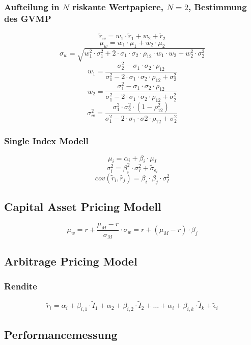 \subsubsection{Aufteilung in \(N\) riskante Wertpapiere, \(N = 2\), Bestimmung des GVMP}
\[\tilde{r}_w = w_1 \cdot \tilde{r}_1 + w_2 + \tilde{r}_2\]
\[\mu_w = w_1 \cdot \mu_1 + w_2 \cdot \mu_2\]
\[\sigma_w = \sqrt{w_1^2 \cdot \sigma_1^2 + 2 \cdot \sigma_1 \cdot \sigma_2 \cdot \rho_{12} \cdot w_1 \cdot w_2 + w_2^2 \cdot \sigma_2^2}\]
\[w_1 = \frac{\sigma_2^2-\sigma_1 \cdot \sigma_2 \cdot \rho_{12}}{\sigma_1^2-2 \cdot \sigma_1 \cdot \sigma_2 \cdot \rho_{12} + \sigma_2^2}\]
\[w_2 = \frac{\sigma_1^2 - \sigma_1 \cdot \sigma_2 \cdot \rho_{12}}{\sigma_1^2 - 2 \cdot \sigma_1 \cdot \sigma_2 \cdot \rho_{12} + \sigma_2^2}\]
\[\sigma_w^2 = \frac{\sigma_1^2 \cdot \sigma_2^2 \cdot (1 - \rho_{12}^2)}{\sigma_1^2 - 2 \cdot \sigma_1 \cdot \sigma2 \cdot \rho_{12} + \sigma_2^2}\]

\subsubsection{Single Index Modell}
\[\mu_i = \alpha_i + \beta_i \cdot \mu_I\]
\[\sigma_i^2 = \beta_i^2 \cdot \sigma_I^2 + \tilde{\sigma}_{\epsilon_i}\]
\[cov(\tilde{r}_i, \tilde{r_j}) = \beta_i \cdot \beta_j \cdot \sigma_I^2\]


\subsection{Capital Asset Pricing Modell}
\[\mu_w = r + \frac{\mu_M - r}{\sigma_M} \cdot \sigma_w = r + (\mu_M - r) \cdot \beta_j\]


\subsection{Arbitrage Pricing Model}

\subsubsection{Rendite}
\[\tilde{r}_i = \alpha_i + \beta_{i,1} \cdot \tilde{I}_1 + \alpha_2 + \beta_{i,2} \cdot \tilde{I}_2 + \dots + \alpha_i + \beta_{i,k} \cdot \tilde{I}_k + \tilde{\epsilon}_i\]


\subsection{Performancemessung}

